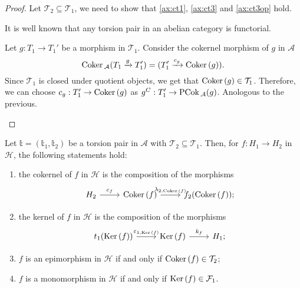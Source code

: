 \begin{proof}
  Let $\mathcal{T}_2\subseteq\mathcal{T}_1$, we need to show that \cref{ax:ct1},
  \cref{ax:ct3} and \cref{ax:ct3op} hold.
  \begin{torsionaxioms}
    \item It is well known that any torsion pair in an abelian category is functorial.
    \setcounter{enumi}{2}
    \item Let $g:T_1\to T_1'$ be a morphism in $\mathcal{T}_1$. Consider the cokernel morphism
    of $g$ in $\mathcal{A}$
    \begin{equation*}
      \mathrm{\textup{Coker\,}}_\mathcal{A}(T_1\xrightarrow{g}T_1')=(T_1'\xrightarrow{c_g}\mathrm{\textup{Coker\,}}(g)).
    \end{equation*}
    Since $\mathcal{T}_1$ is closed under quotient objects, we get that $\mathrm{\textup{Coker\,}}(g)\in\mathcal{T}_1$.
    Therefore, we can choose $c_g:T_1'\to\mathrm{\textup{Coker\,}}(g)$ as $g^C:T_1'\to\mathrm{\textup{PCok\,}}_\mathcal{A}(g)$.
    \varitem{^\ast} Anologous to the previous.
  \end{torsionaxioms}
\end{proof}

\begin{corollary}\label{cor:2.3}
  Let $\mathbb{t}=(\mathbb{t}_1,\mathbb{t}_2)$ be a torsion pair in $\mathcal{A}$ with $\mathcal{T}_2\subseteq\mathcal{T}_1$.
  Then, for $f:H_1\to H_2$ in $\mathcal{H}$, the following statements hold:
  \begin{enumerate}[label=(\alph*),ref=(\alph*)]
    \item\label{cor:2.3:a} the cokernel of $f$ in $\mathcal{H}$ is the composition of the morphisms
      \begin{equation*}
        \begin{tikzcd}
          H_2\arrow{r}{c_f}&\Coker(f)\arrow{r}{\lambda_{2,\Coker(f)}}&f_2(\Coker(f));
        \end{tikzcd}
      \end{equation*}
    \item\label{cor:2.3:b} the kernel of $f$ in $\mathcal{H}$ is the composition of the morphisms
      \begin{equation*}
        \begin{tikzcd}
          t_1(\Ker(f))\arrow{r}{\varepsilon_{1,\Ker(f)}}&\Ker(f)\arrow{r}{k_f}&H_1;
        \end{tikzcd}
      \end{equation*}
    \item\label{cor:2.3:c} $f$ is an epimorphism in $\mathcal{H}$ if and only if $\mathrm{\textup{Coker\,}}(f)\in\mathcal{T}_2$;
    \item\label{cor:2.3:d} $f$ is a monomorphism in $\mathcal{H}$ if and only if $\mathrm{\textup{Ker\,}}(f)\in\mathcal{F}_1$.
  \end{enumerate}
\end{corollary}

